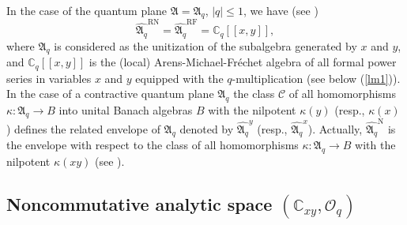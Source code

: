 \documentclass[12pt]{amsart}%
\theoremstyle{plain}
\numberwithin{equation}{section}
\numberwithin{equation}{section}
\numberwithin{theorem}{section}
\numberwithin{lemma}{section}
\numberwithin{remark}{section}
\numberwithin{example}{section}
\numberwithin{proposition}{section}
\numberwithin{definition}{section}
\numberwithin{corollary}{section}
\begin{document}
In the case of the quantum plane $\mathfrak{A=A}_{q}$, $\left\vert
q\right\vert \leq1$, we have (see \cite{DosiSS})
\begin{equation}
\widehat{\mathfrak{A}_{q}}^{\text{RN}}=\widehat{\mathfrak{A}_{q}}^{\text{RF}%
}=\mathbb{C}_{q}\left[  \left[  x,y\right]  \right]  , \label{Cq}%
\end{equation}
where $\mathfrak{A}_{q}$ is considered as the unitization of the subalgebra
generated by $x$ and $y$, and $\mathbb{C}_{q}\left[  \left[  x,y\right]
\right]  $ is the (local) Arens-Michael-Fr\'{e}chet algebra of all formal
power series in variables $x$ and $y$ equipped with the $q$-multiplication
(see below (\ref{lm1})). In the case of a contractive quantum plane
$\mathfrak{A}_{q}$ the class $\mathcal{C}$ of all homomorphisms $\kappa
:\mathfrak{A}_{q}\rightarrow B$ into unital Banach algebras $B$ with the
nilpotent $\kappa\left(  y\right)  $ (resp., $\kappa\left(  x\right)  $)
defines the related envelope of $\mathfrak{A}_{q}$ denoted by
$\widehat{\mathfrak{A}_{q}}^{y}$ (resp., $\widehat{\mathfrak{A}_{q}}^{x}$).
Actually, $\widehat{\mathfrak{A}_{q}}^{\text{N}}$ is the envelope with respect
to the class of all homomorphisms $\kappa:\mathfrak{A}_{q}\rightarrow B$ with
the nilpotent $\kappa\left(  xy\right)  $ (see \cite{DosiSS}).

\subsection{Noncommutative analytic space $\left(  \mathbb{C}_{xy}%
,\mathcal{O}_{q}\right)  $}
\end{document}
